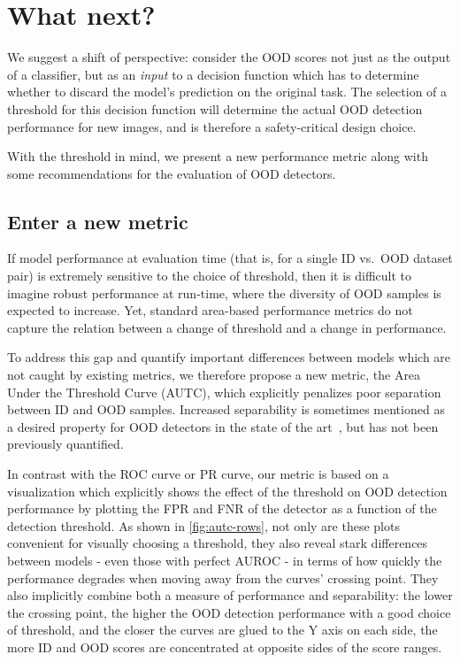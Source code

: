 \documentclass[10pt,twocolumn,letterpaper]{article}
\begin{document}




\section{What next?}\label{sec:alternative}

We suggest a shift of perspective: consider the OOD scores not just as the output of a classifier, but as an \textit{input} to a decision function which has to determine whether to discard the model's prediction on the original task. The selection of a threshold for this decision function will determine the actual OOD detection performance for new images, and is therefore a safety-critical design choice. 

With the threshold in mind, we present a new performance metric along with some recommendations for the evaluation of OOD detectors.

\subsection{Enter a new metric}

If model performance at evaluation time (that is, for a single ID vs.~OOD dataset pair) is extremely sensitive to the choice of threshold, then it is difficult to imagine robust performance at run-time, where the diversity of OOD samples is expected to increase. Yet, standard area-based performance metrics do not capture the relation between a change of threshold and a change in performance.

To address this gap and quantify important differences between models which are not caught by existing metrics, we therefore propose a new metric, the Area Under the Threshold Curve (AUTC), which explicitly penalizes poor separation between ID and OOD samples. Increased separability is sometimes mentioned as a desired property for OOD detectors in the state of the art~\cite{odin-2018}, but has not been previously quantified.

In contrast with the ROC curve or PR curve, our metric is based on a visualization which explicitly shows the effect of the threshold on OOD detection performance by plotting the FPR and FNR of the detector as a function of the detection threshold. As shown in  \cref{fig:autc-rows}, not only are these plots convenient for visually choosing a threshold, they also reveal stark differences between models - even those with perfect AUROC - in terms of how quickly the performance degrades when moving away from the curves' crossing point. They also implicitly combine both a measure of performance and separability: the lower the crossing point, the higher the OOD detection performance with a good choice of threshold, and the closer the curves are glued to the Y axis on each side, the more ID and OOD scores are concentrated at opposite sides of the score ranges.
\end{document}
